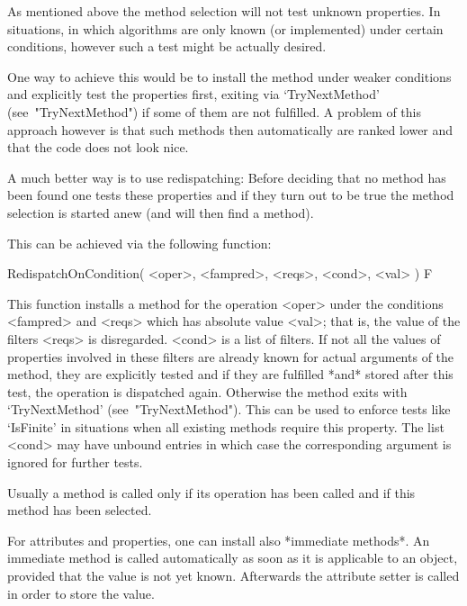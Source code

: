 
As mentioned above the method selection will not test unknown properties.
In situations, in which algorithms are only known (or implemented) under
certain conditions, however such a test might be actually desired.

One way to achieve this would be to install the method under weaker
conditions and explicitly test the properties first, exiting via
`TryNextMethod' (see~"TryNextMethod") if some of them are not fulfilled.
A problem of this approach however is that such methods then automatically
are ranked lower and that the code does not look nice.

A much better way is to use redispatching: Before deciding that no method
has been found one tests these properties and if they turn out to be true
the method selection is started anew (and will then find a method).

This can be achieved via the following function:

\>RedispatchOnCondition( <oper>, <fampred>, <reqs>, <cond>, <val> ) F

This function installs a method for the operation <oper> under the
conditions <fampred> and <reqs> which has absolute value <val>;
that is, the value of the filters <reqs> is disregarded.
<cond> is a list of filters.                                                
If not all the values of properties involved in these filters are already   
known for actual arguments of the method,
they are explicitly tested and if they are fulfilled *and* stored after     
this test, the operation is dispatched again.                               
Otherwise the method exits with `TryNextMethod' (see~"TryNextMethod").
This can be used to enforce tests like `IsFinite' in situations when all    
existing methods require this property.                                     
The list <cond> may have unbound entries in which case the corresponding    
argument is ignored for further tests.



Usually a method is called only if its operation has been called
and if this method has been selected.

For attributes and properties, one can install also *immediate methods*.
An immediate method is called automatically as soon as it is applicable
to an object, provided that the value is not yet known.
Afterwards the attribute setter is called in order to store the value.

